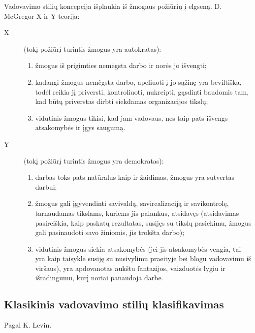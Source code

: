 Vadovavimo stilių koncepcija išplaukia iš žmogaus požiūrių į elgseną.
D. McGregor X ir Y teorija:
\begin{description}
  \item[X] (tokį požiūrį turintis žmogus yra autokratas):
    \begin{enumerate}
      \item žmogus iš prigimties nemėgsta darbo ir norės jo išvengti;
      \item kadangi žmogus nemėgsta darbo, apeliuoti į jo sąžinę yra
        beviltiška, todėl reikia jį priversti, kontroliuoti, nukreipti,
        gąsdinti baudomis tam, kad būtų priverstas dirbti siekdamas
        organizacijos tikslų;
      \item vidutinis žmogus tikisi, kad jam vadovaus, nes taip pats
        išvengs atsakomybės ir įgys saugumą.
    \end{enumerate}
  \item[Y] (tokį požiūrį turintis žmogus yra demokratas):
    \begin{enumerate}
      \item darbas toks pats natūralus kaip ir žaidimas, žmogus yra
        sutvertas darbui;
      \item žmogus gali įgyvendinti savivaldą, savirealizaciją ir
        savikontrolę, tarnaudamas tikslams, kuriems jis palankus,
        atsidavęs (atsidavimas pasireiškia, kaip paskatų rezultatas,
        susijęs su tikslų pasiekimu, žmogus gali pasinaudoti savo
        žiniomis, jis trokšta darbo);
      \item vidutinis žmogus siekia atsakomybės (jei jis atsakomybės
        vengia, tai yra kaip taisyklė susiję su nusivylimu praeityje
        bei blogu vadovavimu iš viršaus), yra apdovanotas aukštu
        fantazijos, vaizduotės lygiu ir išradingumu, kurį noriai
        panaudoja darbe.
    \end{enumerate}
\end{description}

\subsection{Klasikinis vadovavimo stilių klasifikavimas}

Pagal K. Levin.

